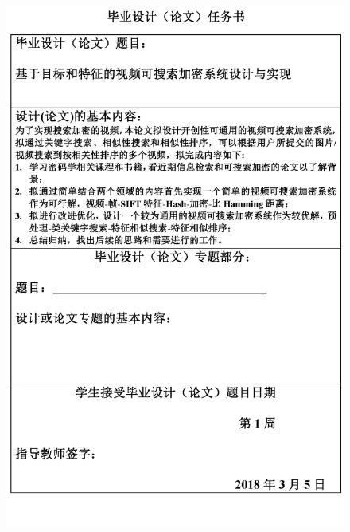 \documentclass[a4paper,12pt,UTF8]{ctexart}
\begin{document}
	
\date{}

\clearpage
{}   
\begin{figure}[t]
	\centering
	\includegraphics[width=1\textwidth]{proposal.png} %
\end{figure}
\clearpage
\end{document}
